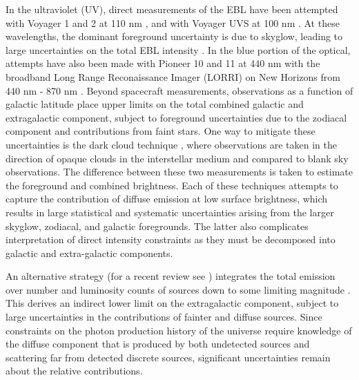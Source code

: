 \documentclass[fleqn,usenatbib]{mnras}
\begin{document}
In the ultraviolet (UV), direct measurements of the EBL have been attempted with Voyager 1 and 2 at 110 nm \citep{Murthy1999}, and with Voyager UVS at 100 nm \citep{Edelstein2000}. At these wavelengths, the dominant foreground uncertainty is due to skyglow, leading to large uncertainties on the total EBL intensity \citep{Mattila2019}. In the blue portion of the optical, attempts have also been made with Pioneer 10 and 11 \citep{Matsuoka2011} at 440 nm with the broadband Long Range Reconaissance Imager (LORRI) on New Horizons from 440 nm - 870 nm \citep{Zemcov2017,lauer2020new}. Beyond spacecraft measurements, observations as a function of galactic latitude \citep{Hamden2013,Murthy2018} place upper limits on the total combined galactic and extragalactic component, subject to foreground uncertainties due to the zodiacal component and contributions from faint stars. One way to mitigate these uncertainties is the dark cloud technique \citep{Mattila1990,Mattila2017}, where observations are taken in the direction of opaque clouds in the interstellar medium and compared to blank sky observations. The difference between these two measurements is taken to estimate the foreground and combined brightness. Each of these techniques attempts to capture the contribution of diffuse emission at low surface brightness, which results in large statistical and systematic uncertainties arising from the larger skyglow, zodiacal, and galactic foregrounds. The latter also complicates interpretation of direct intensity constraints as they must be decomposed into galactic and extra-galactic components. 


An alternative strategy (for a recent review see \citealt{Hill2018}) integrates the total emission over number and luminosity counts of sources down to some limiting magnitude \citep{Madau2000,Gardner2000,Driver2016}. This derives an indirect lower limit on the extragalactic component, subject to large uncertainties in the contributions of fainter and diffuse sources. Since constraints on the photon production history of the universe require knowledge of the diffuse component that is produced by both undetected sources and scattering far from detected discrete sources, significant uncertainties remain about the relative contributions. 
\end{document}
